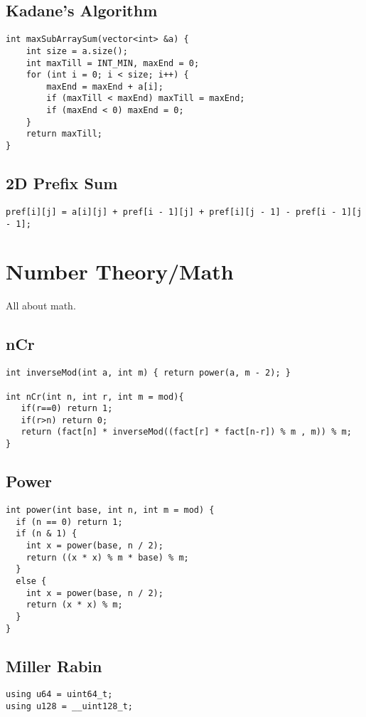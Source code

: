 \documentclass[10pt, a4paper]{article}
\begin{document}
\begin{multicols}{2}
\subsection{Kadane’s Algorithm}
\begin{lstlisting}
int maxSubArraySum(vector<int> &a) {
	int size = a.size();
	int maxTill = INT_MIN, maxEnd = 0;
	for (int i = 0; i < size; i++) {
		maxEnd = maxEnd + a[i];
		if (maxTill < maxEnd) maxTill = maxEnd;
		if (maxEnd < 0) maxEnd = 0;
	}
	return maxTill;
}
\end{lstlisting}

\subsection{2D Prefix Sum}
\begin{lstlisting}
pref[i][j] = a[i][j] + pref[i - 1][j] + pref[i][j - 1] - pref[i - 1][j - 1];
\end{lstlisting}

\section{Number Theory/Math}
All about math.
\subsection{nCr}
\begin{lstlisting}
int inverseMod(int a, int m) { return power(a, m - 2); }

int nCr(int n, int r, int m = mod){
   if(r==0) return 1;
   if(r>n) return 0;
   return (fact[n] * inverseMod((fact[r] * fact[n-r]) % m , m)) % m;
}
\end{lstlisting}
\subsection{Power}
\begin{lstlisting}
int power(int base, int n, int m = mod) {
  if (n == 0) return 1;
  if (n & 1) {
    int x = power(base, n / 2);
    return ((x * x) % m * base) % m;
  }
  else {
    int x = power(base, n / 2);
    return (x * x) % m;
  }
}
\end{lstlisting}
\subsection{Miller Rabin}
\begin{lstlisting}
using u64 = uint64_t;
using u128 = __uint128_t;


\end{lstlisting}
\end{multicols}
\end{document}
